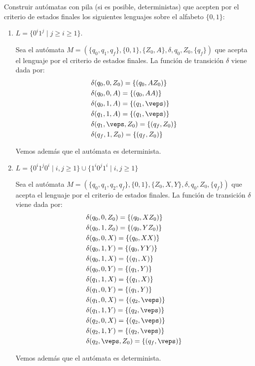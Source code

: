 \begin{ejercicio}\label{ej:1.5.20}
    Construir autómatas con pila (si es posible, deterministas) que acepten por el criterio de estados finales los siguientes lenguajes sobre el alfabeto $\{0,1\}$:
    \begin{enumerate}
        \item $L = \{0^i 1^j \mid j\geq i \geq 1\}$.
        
        Sea el autómata $M = (\{q_0,q_1,q_f\},\{0,1\},\{Z_0,A\},\delta,q_0,Z_0,\{q_f\})$ que acepta el lenguaje por el criterio de estados finales. La función de transición $\delta$ viene dada por:
        \begin{align*}
            &\delta(q_0,0,Z_0) = \{(q_0,AZ_0)\} \\
            &\delta(q_0,0,A) = \{(q_0,AA)\} \\
            &\delta(q_0,1,A) = \{(q_1,\veps)\} \\
            &\delta(q_1,1,A) = \{(q_1,\veps)\} \\
            &\delta(q_1,\veps,Z_0) = \{(q_f,Z_0)\} \\
            &\delta(q_f,1,Z_0) = \{(q_f,Z_0)\}
        \end{align*}

        Vemos además que el autómata es determinista.
        \item $L = \{0^i 1^j 0^i \mid i,j\geq 1\}\cup \{1^i 0^j 1^i \mid i,j\geq 1\}$
        
        Sea el autómata $M = (\{q_0,q_1,q_2,q_f\},\{0,1\},\{Z_0,X,Y\},\delta,q_0,Z_0,\{q_f\})$ que acepta el lenguaje por el criterio de estados finales. La función de transición $\delta$ viene dada por:
        \begin{align*}
            &\delta(q_0,0,Z_0) = \{(q_0,XZ_0)\} \\
            &\delta(q_0,1,Z_0) = \{(q_0,YZ_0)\} \\
            &\delta(q_0,0,X) = \{(q_0,XX)\} \\
            &\delta(q_0,1,Y) = \{(q_0,YY)\} \\
            &\delta(q_0,1,X) = \{(q_1,X)\} \\
            &\delta(q_0,0,Y) = \{(q_1,Y)\} \\
            &\delta(q_1,1,X) = \{(q_1,X)\} \\
            &\delta(q_1,0,Y) = \{(q_1,Y)\} \\
            &\delta(q_1,0,X) = \{(q_2,\veps)\} \\
            &\delta(q_1,1,Y) = \{(q_2,\veps)\} \\
            &\delta(q_2,0,X) = \{(q_2,\veps)\} \\
            &\delta(q_2,1,Y) = \{(q_2,\veps)\} \\
            &\delta(q_2,\veps,Z_0) = \{(q_f,\veps)\}
        \end{align*}

        Vemos además que el autómata es determinista.
    \end{enumerate}
\end{ejercicio}

